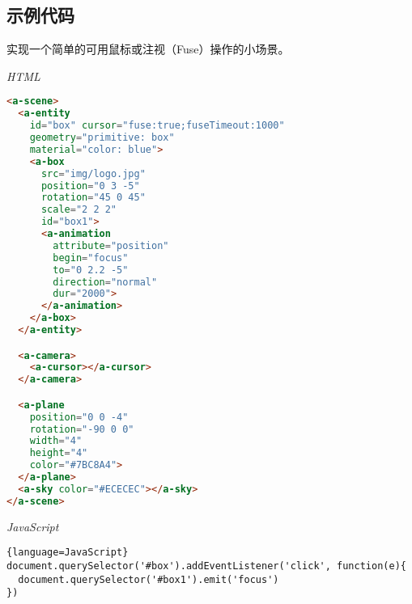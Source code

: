 \subsection{示例代码}
实现一个简单的可用鼠标或注视（Fuse）操作的小场景。


\emph{HTML}
\begin{lstlisting}[language=HTML]
<a-scene>
  <a-entity
    id="box" cursor="fuse:true;fuseTimeout:1000"
    geometry="primitive: box"
    material="color: blue">
    <a-box
      src="img/logo.jpg"
      position="0 3 -5"
      rotation="45 0 45"
      scale="2 2 2"
      id="box1">
      <a-animation
        attribute="position"
        begin="focus"
        to="0 2.2 -5"
        direction="normal"
        dur="2000">
      </a-animation>
    </a-box>
  </a-entity>

  <a-camera>
    <a-cursor></a-cursor>
  </a-camera>

  <a-plane 
    position="0 0 -4" 
    rotation="-90 0 0" 
    width="4" 
    height="4" 
    color="#7BC8A4">
  </a-plane>
  <a-sky color="#ECECEC"></a-sky>
</a-scene>
\end{lstlisting} 

\emph{JavaScript}
\begin{lstlisting}{language=JavaScript}
document.querySelector('#box').addEventListener('click', function(e){
  document.querySelector('#box1').emit('focus')
})
\end{lstlisting}
